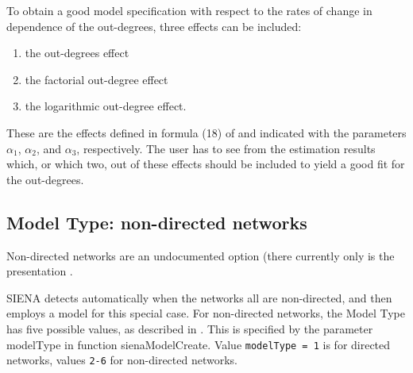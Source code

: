 \documentclass[a4paper,fleqn,11pt]{article}
\newcommand{\+}{\, + \,}
\newcommand{\sfn}[1]{\textsf{#1}}
\newcommand{\SI}{{\sf SIENA }}
\begin{document}
{To obtain a good model specification with respect to the rates of
change in dependence of the out-degrees, three effects can be
included:
\begin{enumerate}
\item the out-degrees effect
\item the factorial out-degree effect
\item the logarithmic out-degree effect.
\end{enumerate}
These are the effects defined in formula (18) of \citet{Snijders03}
and indicated with the parameters $\alpha_1$, $\alpha_2$,
and $\alpha_3$, respectively.
The user has to see from the estimation results which, or which two,
out of these effects
should be included to yield a good fit for the out-degrees.
\medskip
\fi

\subsection{Model Type: non-directed networks}
\label{S_modeltype_nd}

Non-directed networks are an undocumented option (there currently
only is the presentation \citet{Snijders07}.

\SI detects automatically when the networks all are non-directed,
and then employs a model for this special case.
For non-directed networks, the Model Type has five possible values,
as described in \citet{Snijders07}.
This is specified by the parameter \sfn{modelType} in function
\sfn{sienaModelCreate}.
Value \texttt{modelType = 1} is for directed networks, values
\texttt{2-6} for non-directed networks.

}
\end{document}
